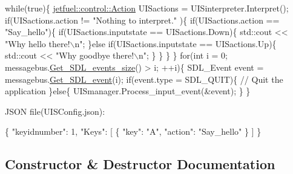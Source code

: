 \begin{DoxyCode}
\textcolor{keywordflow}{while}(\textcolor{keyword}{true})\{
    \hyperlink{structjetfuel_1_1control_1_1Action}{jetfuel::control::Action} UISactions =
    UISinterpreter.Interpret();
    \textcolor{keywordflow}{if}(UISactions.action != \textcolor{stringliteral}{"Nothing to interpret."}
       )\{
            \textcolor{keywordflow}{if}(UISactions.action == \textcolor{stringliteral}{"Say\_hello"})\{
                \textcolor{keywordflow}{if}(UISactions.inputstate ==
                  UISactions.Down)\{
                   std::cout << \textcolor{stringliteral}{"Why hello there!\(\backslash\)n"};
                \}\textcolor{keywordflow}{else} \textcolor{keywordflow}{if}(UISactions.inputstate ==
                         UISactions.Up)\{
                    std::cout
                    << \textcolor{stringliteral}{"Why goodbye there!\(\backslash\)n"};
                \}
            \}
        \}
\}
\textcolor{keywordflow}{for}(\textcolor{keywordtype}{int} i = 0; messagebus.\hyperlink{classjetfuel_1_1core_1_1Message__bus_aa363b50d4ba99ae86430b5f12610fd39}{Get\_SDL\_events\_size}() > i; ++i)\{
    SDL\_Event \textcolor{keyword}{event} = messagebus.\hyperlink{classjetfuel_1_1core_1_1Message__bus_ab80c8b51aca00ad4942ee2114fdf2fec}{Get\_SDL\_event}(i);
    \textcolor{keywordflow}{if}(event.type = SDL\_QUIT)\{
        \textcolor{comment}{// Quit the application}
    \}\textcolor{keywordflow}{else}\{
        UISmanager.Process\_input\_event(&event);
    \}
\}
\end{DoxyCode}


\begin{DoxyVerb}JSON file(UISConfig.json):
\end{DoxyVerb}
 
\begin{DoxyCode}
\{
    \textcolor{stringliteral}{"keyidnumber"}: 1,
    \textcolor{stringliteral}{"Keys"}: [
      \{
        \textcolor{stringliteral}{"key"}: \textcolor{stringliteral}{"A"},
        \textcolor{stringliteral}{"action"}: \textcolor{stringliteral}{"Say\_hello"}
      \}
    ]
\}
\end{DoxyCode}
 

\subsection{Constructor \& Destructor Documentation}
\mbox{\label{classjetfuel_1_1control_1_1UIS__manager_a04d1feda567af305a4495b189ef9bc8f}} 
